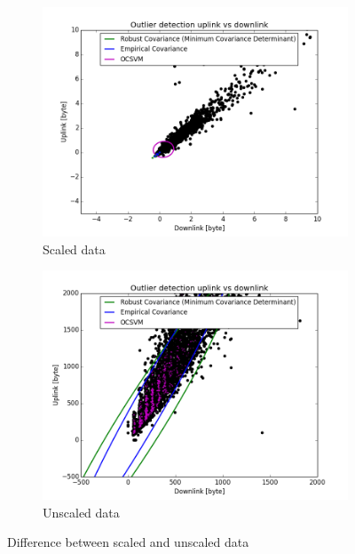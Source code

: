 \begin{figure}[hbp]
\centering
	\begin{subfigure}[b]{0.4\textwidth}
		\centering
		\includegraphics[scale=0.28]{figs/scaleUpVSDown.png}
        \caption{Scaled data}
        \label{fig:scaledUpDown}
	\end{subfigure}
	\begin{subfigure}[b]{0.4\textwidth}
		\centering
		\includegraphics[scale=0.28]{figs/unscaledUpVSDown.png}
		\caption{Unscaled data}
		\label{fig:unscaledUpDown}
	\end{subfigure}
\caption{Difference between scaled and unscaled data}
\label{fig:scaledVSUnscaledUpDown}
\end{figure}


